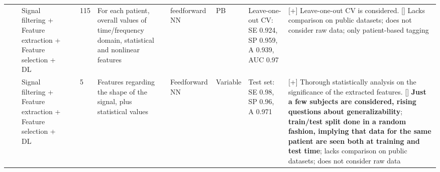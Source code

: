 \documentclass[5p,twocolumn,lefttitle]{elsarticle}
\begin{document}
\begin{table*}[t]
{\begin{tabularx}{2\textwidth}{@{}m{2.5em}p{7em}p{10em}lp{2em}p{12em}p{7em}p{3em}p{17em}X@{}}
                            &                                                         & Signal filtering + Feature extraction + Feature selection + DL & \cite{morillo2013probabilistic}          & 115           & For each patient, overall values of time/frequency domain, statistical and nonlinear features                     & feedforward NN                      & PB                                & Leave-one-out CV: SE 0.924, SP 0.959, A 0.939, AUC 0.97                                                                                                                                 & [+] Leave-one-out CV is considered. [] Lacks comparison on public datasets; does not consider raw data; only patient-based tagging                                                                                                                                                                                                                                                                                                                                                \\
                    \cmidrule(l){3-10} 
                            &                                                         & Signal filtering + Feature extraction + Feature selection + DL & \cite{DBLP:journals/nca/UcarBBP17}       & 5             & Features regarding the shape of the signal, plus statistical values                                               & Feedforward NN                      & Variable & Test set: SE 0.98, SP 0.96, A 0.971                                                                                                                                                       & [+] Thorough statistically analysis on the significance of the extracted features. [] \textbf{Just a few subjects are considered, rising questions about generalizability}; \textbf{train/test split done in a random fashion, implying that data for the same patient are seen both at training and test time}; lacks comparison on public datasets; does not consider raw data                                \\
                    \cmidrule(l){3-10} 

\end{tabularx}}
\end{table*}
\end{document}
